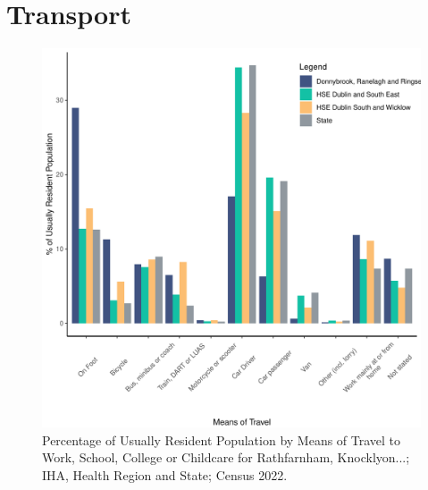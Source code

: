 \documentclass{article}
\begin{document}
\section{Transport}\label{sect:Trans}
\begin{figure}[H]
	\centering
	\includegraphics[width = 120mm]{../figures/TravelED.pdf}
	\caption{Percentage of Usually Resident Population by Means of Travel to Work, School, College or Childcare for Rathfarnham, Knocklyon...; IHA, Health Region and State; Census 2022.}
	\label{fig:vbnv}
	\end{figure}
\end{document}
